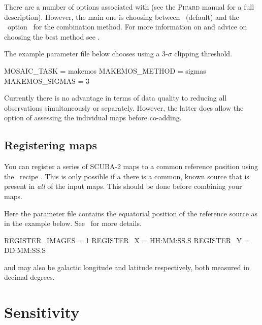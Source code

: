 There are a number of options associated with
 (see the \textsc{Picard} manual for a full
description). However, the main one is choosing between \wcsmosaic\
(default) and the \ccdpack\ option \makemos\ for the combination
method. For more information on \task{makemos} and advice on choosing the
best method see \xref{\textbf{SUN/139}}{sun139}{}.

The example parameter file below chooses  using a 3-$\sigma$
clipping threshold.

\begin{terminalv}
MOSAIC_TASK = makemos
MAKEMOS_METHOD = sigmas
MAKEMOS_SIGMAS = 3
\end{terminalv}

Currently there is no advantage in terms of data quality to reducing
all observations simultaneously or separately. However, the latter
does allow the option of assessing the individual maps before co-adding.


\subsection{Registering maps}

You can register a series of SCUBA-2 maps to a common reference
position using the \picard\ recipe
.
This is only possible if a there is a common, known source that is
present in \textit{all} of the input maps. This should be done before
combining your maps.

\begin{terminalv}
\end{terminalv}

Here the parameter file contains the equatorial position of the
reference source as in the example below. See \picardsun\ for more
details.

\begin{terminalv}
REGISTER_IMAGES = 1
REGISTER_X  = HH:MM:SS.S
REGISTER_Y  = DD:MM:SS.S
\end{terminalv}

 and  may also be galactic
longitude and latitude respectively, both measured in decimal
degrees.

\section{Sensitivity}

